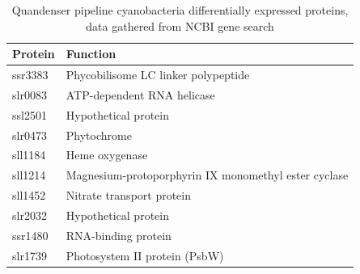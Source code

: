 \begin{center}
\begin{table}[H]
\caption{Quandenser pipeline cyanobacteria differentially expressed proteins, data gathered from NCBI gene search \cite{ncbi-search}}
\begin{tabular}{ l l }
\toprule
Protein & Function \\ \midrule
ssr3383 & Phycobilisome LC linker polypeptide \\ [0.5ex]
slr0083 & ATP-dependent RNA helicase \\ [0.5ex]
ssl2501 & Hypothetical protein \\ [0.5ex]
slr0473 & Phytochrome \\ [0.5ex]
sll1184 & Heme oxygenase \\ [0.5ex]
sll1214 & Magnesium-protoporphyrin IX monomethyl ester cyclase \\ [0.5ex]
sll1452 & Nitrate transport protein \\ [0.5ex]
slr2032 & Hypothetical protein \\ [0.5ex]
ssr1480 & RNA-binding protein \\ [0.5ex]
slr1739 & Photosystem II protein (PsbW) \\ \bottomrule
\end{tabular}
\centering
\label{table:cyano-proteins}
\end{table}
\end{center}

